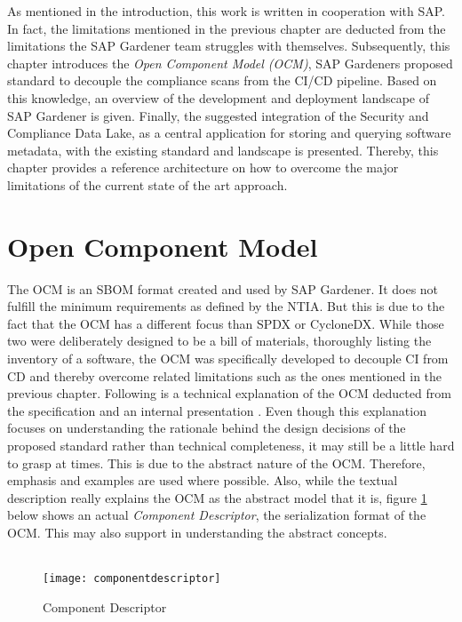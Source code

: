 As mentioned in the introduction, this work is written in cooperation with SAP. In fact, the limitations mentioned in the previous chapter are deducted from the limitations the SAP Gardener team struggles with themselves. Subsequently, this chapter introduces the \textit{Open Component Model (OCM)}, SAP Gardeners proposed standard to decouple the compliance scans from the CI/CD pipeline. Based on this knowledge, an overview of the development and deployment landscape of SAP Gardener is given. Finally, the suggested integration of the Security and Compliance Data Lake, as a central application for storing and querying software metadata, with the existing standard and landscape is presented. Thereby, this chapter provides a reference architecture on how to overcome the major limitations of the current state of the art approach. 

\section{Open Component Model}
The OCM is an SBOM format created and used by SAP Gardener. It does not fulfill the minimum requirements as defined by the NTIA. But this is due to the fact that the OCM has a different focus than SPDX or CycloneDX. While those two were deliberately designed to be a bill of materials, thoroughly listing the inventory of a software, the OCM was specifically developed to decouple CI from CD and thereby overcome related limitations such as the ones mentioned in the previous chapter. Following is a technical explanation of the OCM deducted from the specification \cite{OCMSpec} and an internal presentation \cite{OCMInternalPresentation}. Even though this explanation focuses on understanding the rationale behind the design decisions of the proposed standard rather than technical completeness, it may still be a little hard to grasp at times. This is due to the abstract nature of the OCM. Therefore, emphasis and examples are used where possible. Also, while the textual description really explains the OCM as the abstract model that it is, figure \ref{fig:ComponentDescriptor} below shows an actual \emph{Component Descriptor}, the serialization format of the OCM. This may also support in understanding the abstract concepts.\\\\

\begin{figure}[H]
	\centering
	\texttt{[image: componentdescriptor]}
	\caption[Component Descriptor]{Component Descriptor }
	\label{fig:ComponentDescriptor}
\end{figure}


